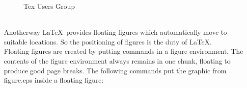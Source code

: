 \documentclass{article}
\theoremstyle{definition}
\theoremstyle{remark}
\theoremstyle{plain}
\numberwithin{equation}{subsection}
\begin{document}
{\begin{figure}[htbp]
	\caption{Tex Users Group}
	\label{fig:tex1}
\end{figure}\\
\newpage
\noindent Anotherway \LaTeX\ provides floating figures which automatically move to suitable locations.
So the positioning of figures is the duty of \LaTeX.\\ 
Floating figures are created by putting commands in a figure environment. The contents of the figure environment always remains in one chunk, floating to produce good page breaks. The following commands put the graphic from figure.eps inside a floating
figure:\\
\begin{figure}[htbp]
	\centering
\end{figure}}
\end{document}
